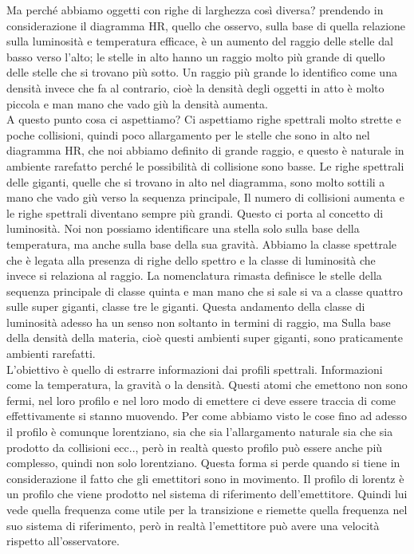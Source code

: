 \documentclass[a4paper,11pt]{article}
\begin{document}
Ma perché abbiamo oggetti con righe di larghezza così diversa?
prendendo in considerazione il diagramma HR, quello che osservo, sulla base di quella relazione sulla luminosità e temperatura efficace,  è un aumento del raggio delle stelle dal basso verso l'alto; le stelle in alto hanno un raggio molto più grande di quello delle stelle che si trovano più sotto. 
Un raggio più grande lo identifico come una densità invece che fa al contrario, cioè la densità degli oggetti in atto è molto piccola e man mano che vado giù la densità aumenta. 
\\A questo punto cosa ci aspettiamo?
Ci aspettiamo righe spettrali molto strette e poche collisioni, quindi poco allargamento per le stelle che sono in alto nel diagramma HR, che noi abbiamo definito di grande raggio, e questo è naturale in ambiente rarefatto perché le possibilità di collisione sono basse.
Le righe spettrali delle giganti, quelle che si trovano in alto nel diagramma, sono molto sottili a mano che vado giù verso la sequenza principale, Il numero di collisioni aumenta e le righe spettrali diventano sempre più grandi.
Questo ci porta al concetto di luminosità. Noi non possiamo identificare una stella solo sulla base della temperatura, ma anche sulla base della sua gravità. 
 Abbiamo la classe spettrale che è legata alla presenza di righe dello spettro e la classe di luminosità che invece si relaziona al raggio.
 La nomenclatura rimasta definisce le stelle della sequenza principale di classe quinta e man mano che si sale si va a classe quattro sulle super giganti, classe tre le giganti. 
Questa andamento della classe di luminosità adesso ha un senso non soltanto in termini di raggio, ma Sulla base della densità della materia, cioè questi ambienti super giganti, sono praticamente ambienti rarefatti. 
\\L’obiettivo è quello di estrarre informazioni dai profili spettrali. Informazioni come la temperatura, la gravità o la densità.
Questi atomi che emettono non sono fermi, nel loro profilo e nel loro modo di emettere ci deve essere traccia di come effettivamente si stanno muovendo.
Per come abbiamo visto le cose fino ad adesso il profilo è comunque lorentziano, sia che sia l’allargamento naturale sia che sia prodotto da collisioni ecc.., però in realtà questo profilo può essere anche più complesso, quindi non solo lorentziano.
Questa forma si perde quando si tiene in considerazione il fatto che gli emettitori sono in movimento. 
Il profilo di lorentz è un profilo che viene prodotto nel sistema di riferimento dell'emettitore. Quindi lui vede quella frequenza come utile per la transizione e riemette quella frequenza nel suo sistema di riferimento, però in realtà l'emettitore può avere una velocità rispetto all’osservatore.
\end{document}
